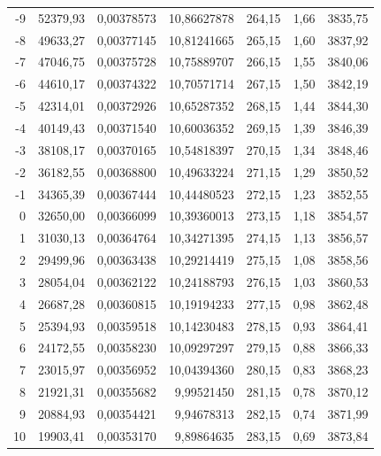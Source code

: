 \documentclass[12pt,a4paper,final,twoside,fleqn]{article}
\begin{document}
\begin{ThreePartTable}
\begin{longtable}{rrrrrrr}
-9           & 52379,93  & 0,00378573    & 10,86627878 & 264,15     & 1,66       & 3835,75 \\
-8           & 49633,27  & 0,00377145    & 10,81241665 & 265,15     & 1,60       & 3837,92 \\
-7           & 47046,75  & 0,00375728    & 10,75889707 & 266,15     & 1,55       & 3840,06 \\
-6           & 44610,17  & 0,00374322    & 10,70571714 & 267,15     & 1,50       & 3842,19 \\
-5           & 42314,01  & 0,00372926    & 10,65287352 & 268,15     & 1,44       & 3844,30 \\
-4           & 40149,43  & 0,00371540    & 10,60036352 & 269,15     & 1,39       & 3846,39 \\
-3           & 38108,17  & 0,00370165    & 10,54818397 & 270,15     & 1,34       & 3848,46 \\
-2           & 36182,55  & 0,00368800    & 10,49633224 & 271,15     & 1,29       & 3850,52 \\
-1           & 34365,39  & 0,00367444    & 10,44480523 & 272,15     & 1,23       & 3852,55 \\
0            & 32650,00  & 0,00366099    & 10,39360013 & 273,15     & 1,18       & 3854,57 \\
1            & 31030,13  & 0,00364764    & 10,34271395 & 274,15     & 1,13       & 3856,57 \\
2            & 29499,96  & 0,00363438    & 10,29214419 & 275,15     & 1,08       & 3858,56 \\
3            & 28054,04  & 0,00362122    & 10,24188793 & 276,15     & 1,03       & 3860,53 \\
4            & 26687,28  & 0,00360815    & 10,19194233 & 277,15     & 0,98       & 3862,48 \\
5            & 25394,93  & 0,00359518    & 10,14230483 & 278,15     & 0,93       & 3864,41 \\
6            & 24172,55  & 0,00358230    & 10,09297297 & 279,15     & 0,88       & 3866,33 \\
7            & 23015,97  & 0,00356952    & 10,04394360 & 280,15     & 0,83       & 3868,23 \\
8            & 21921,31  & 0,00355682    & 9,99521450  & 281,15     & 0,78       & 3870,12 \\
9            & 20884,93  & 0,00354421    & 9,94678313  & 282,15     & 0,74       & 3871,99 \\
10           & 19903,41  & 0,00353170    & 9,89864635  & 283,15     & 0,69       & 3873,84 \\

\end{longtable}
\end{ThreePartTable}
\end{document}
